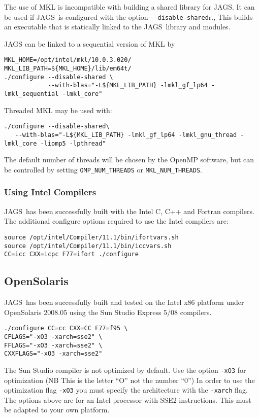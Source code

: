 \documentclass[11pt, a4paper, titlepage]{report}
\newcommand{\JAGS}{\textsf{JAGS}}
\begin{document}
The use of MKL is incompatible with building a shared library for
\JAGS. It can be used if \JAGS\ is configured with the option
\verb+--disable-shared+r., This builds an executable that is statically
linked to the \JAGS\ library and modules.

JAGS can be linked to a sequential version of MKL by
\begin{verbatim}
MKL_HOME=/opt/intel/mkl/10.0.3.020/
MKL_LIB_PATH=${MKL_HOME}/lib/em64t/
./configure --disable-shared \
            --with-blas="-L${MKL_LIB_PATH} -lmkl_gf_lp64 -lmkl_sequential -lmkl_core"
\end{verbatim}

Threaded MKL may be used with:
\begin{verbatim}
./configure --disable-shared\
   --with-blas="-L${MKL_LIB_PATH} -lmkl_gf_lp64 -lmkl_gnu_thread -lmkl_core -liomp5 -lpthread"
\end{verbatim}
The default number of threads will be chosen by the OpenMP software,
but can be controlled by setting \verb+OMP_NUM_THREADS+ or \verb+MKL_NUM_THREADS+.

\subsubsection{Using Intel Compilers}

\JAGS\ has been successfully built with the Intel C, C++ and Fortran
compilers.  The additional configure options required to use the Intel
compilers are:
\begin{verbatim}
source /opt/intel/Compiler/11.1/bin/ifortvars.sh
source /opt/intel/Compiler/11.1/bin/iccvars.sh
CC=icc CXX=icpc F77=ifort ./configure 
\end{verbatim}

\subsection{OpenSolaris}

\JAGS\ has been successfully built and tested on the Intel x86
platform under OpenSolaris 2008.05 using the Sun Studio Express 5/08
compilers.
\begin{verbatim}
./configure CC=cc CXX=CC F77=f95 \
CFLAGS="-xO3 -xarch=sse2" \
FFLAGS="-xO3 -xarch=sse2" \
CXXFLAGS="-xO3 -xarch=sse2"
\end{verbatim}
The Sun Studio compiler is not optimized by default. Use the option
\verb+-xO3+ for optimization (NB This is the letter ``O'' not the
number ``0'') In order to use the optimization flag \verb+-xO3+ you
must specify the architecture with the \verb+-xarch+ flag. The options
above are for an Intel processor with SSE2 instructions. This must be
adapted to your own platform.
\end{document}
